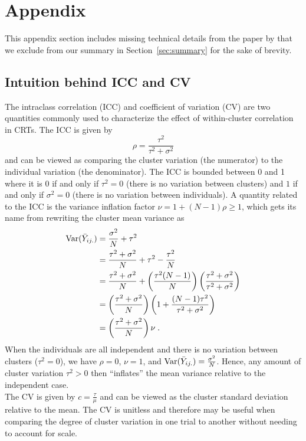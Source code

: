 \documentclass[10pt]{article}
\begin{document}
\newpage


\appendix
\section{Appendix} \label{apx}

This appendix section includes missing technical details from the paper by \textcite{Hussey:2007} that we exclude from our summary in Section~\ref{sec:summary} for the sake of brevity.

\subsection{Intuition behind ICC and CV} \label{apx:correlation}

The intraclass correlation (ICC) and coefficient of variation (CV) are two quantities commonly used to characterize the effect of within-cluster correlation in CRTs. The ICC is given by
\[
\rho = \frac{\tau^2}{\tau^2+\sigma^2}
\]
and can be viewed as comparing the cluster variation (the numerator) to the individual variation (the denominator). The ICC is bounded between 0 and 1 where it is 0 if and only if $\tau^2=0$ (there is no variation between clusters) and $1$ if and only if $\sigma^2=0$ (there is no variation between individuals). A quantity related to the ICC is the variance inflation factor $\nu=1+(N-1)\rho\geq1$, which gets its name from rewriting the cluster mean variance as
\begin{align*}
\mathrm{Var}(\bar{Y}_{ij.}) &= \frac{\sigma^2}{N} + \tau^2 \\
&= \frac{\tau^2+\sigma^2}{N} + \tau^2 - \frac{\tau^2}{N} \\
&= \frac{\tau^2+\sigma^2}{N} + \left(\frac{\tau^2(N-1)}{N}\right)\left(\frac{\tau^2+\sigma^2}{\tau^2+\sigma^2}\right) \\
&= \left(\frac{\tau^2+\sigma^2}{N}\right)\left(1+\frac{(N-1)\tau^2}{\tau^2+\sigma^2}\right) \\
&= \left(\frac{\tau^2+\sigma^2}{N}\right)\nu \;.
\end{align*}
When the individuals are all independent and there is no variation between clusters ($\tau^2=0$), we have $\rho=0$, $\nu=1$, and $\mathrm{Var}(\bar{Y}_{ij.})=\frac{\sigma^2}{N}$. Hence, any amount of cluster variation $\tau^2>0$ then ``inflates'' the mean variance relative to the independent case.
\\

The CV is given by $c=\frac{\tau}{\mu}$ and can be viewed as the cluster standard deviation relative to the mean. The CV is unitless and therefore may be useful when comparing the degree of cluster variation in one trial to another without needing to account for scale.
\end{document}
